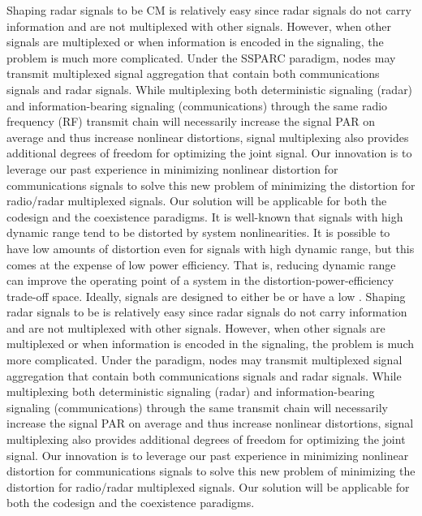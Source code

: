 \documentclass[11pt,onecolumn]{IEEEtran}
\begin{document}
Shaping radar signals to be CM is relatively easy since radar signals do not carry information and are not multiplexed with other signals.  However, when other signals are multiplexed or when information is encoded in the signaling, the problem is much more complicated.  Under the SSPARC paradigm, nodes may transmit multiplexed signal aggregation that contain both communications signals and radar signals. 
While multiplexing both deterministic signaling (radar) and information-bearing signaling (communications) through the same radio frequency (RF) transmit chain will necessarily increase the signal PAR on average and thus increase nonlinear distortions, signal multiplexing also provides additional degrees of freedom for optimizing the joint signal.  Our innovation is to leverage our past experience in minimizing nonlinear distortion for communications signals to solve this new problem of minimizing the distortion for radio/radar multiplexed signals.  Our solution will be applicable for both the codesign and the coexistence paradigms.  
It is well-known that signals with high dynamic range tend to be distorted by system nonlinearities.  It is possible to have low amounts of distortion even for signals with high dynamic range, but this comes at the expense of low power efficiency.  That is, reducing dynamic range can improve the operating point of a system in the distortion-power-efficiency trade-off space. Ideally, signals are designed to either be \CM or have a low \PAR.
Shaping radar signals to be \CM is relatively easy since radar signals do not carry information and are not multiplexed with other signals.  However, when other signals are multiplexed or when information is encoded in the signaling, the problem is much more complicated.  Under the \SSPARC paradigm, nodes may transmit multiplexed signal aggregation that contain both communications signals and radar signals. 
While multiplexing both deterministic signaling (radar) and information-bearing signaling (communications) through the same \RF transmit chain will necessarily increase the signal PAR on average and thus increase nonlinear distortions, signal multiplexing also provides additional degrees of freedom for optimizing the joint signal.  Our innovation is to leverage our past experience in minimizing nonlinear distortion for communications signals to solve this new problem of minimizing the distortion for radio/radar multiplexed signals.  Our solution will be applicable for both the codesign and the coexistence paradigms.  
\end{document}
